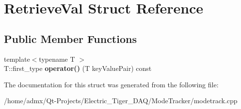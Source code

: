 \hypertarget{struct_retrieve_val}{\section{Retrieve\+Val Struct Reference}
\label{struct_retrieve_val}
}
\subsection*{Public Member Functions}
\begin{DoxyCompactItemize}
\item 
\hypertarget{struct_retrieve_val_a497045c23da008812919a69049998b1e}{{\footnotesize template$<$typename T $>$ }\\T\+::first\+\_\+type {\bfseries operator()} (T key\+Value\+Pair) const }\label{struct_retrieve_val_a497045c23da008812919a69049998b1e}

\end{DoxyCompactItemize}


The documentation for this struct was generated from the following file\+:\begin{DoxyCompactItemize}
\item 
/home/admx/\+Qt-\/\+Projects/\+Electric\+\_\+\+Tiger\+\_\+\+D\+A\+Q/\+Mode\+Tracker/modetrack.\+cpp\end{DoxyCompactItemize}

